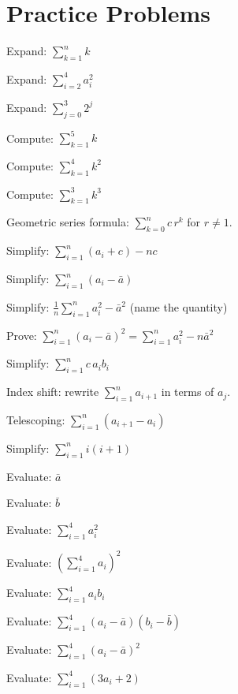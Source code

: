 \section{Practice Problems}

\begin{problems}
  \item Expand: $\displaystyle\sum_{k=1}^{n}k$
  \item Expand: $\displaystyle\sum_{i=2}^{4}a_{i}^{2}$
  \item Expand: $\displaystyle\sum_{j=0}^{3}2^{j}$
  \item Compute: $\displaystyle\sum_{k=1}^{5}k$
  \item Compute: $\displaystyle\sum_{k=1}^{4}k^{2}$
  \item Compute: $\displaystyle\sum_{k=1}^{3}k^{3}$
  \item Geometric series formula: $\displaystyle\sum_{k=0}^{n}c\,r^{k}$ for
        $r\neq 1$.
  \item Simplify: $\displaystyle\sum_{i=1}^{n}(a_{i}+c)-nc$
  \item Simplify: $\displaystyle\sum_{i=1}^{n}(a_{i}-\bar a)$
  \item Simplify: $\displaystyle\frac{1}{n}\sum_{i=1}^{n}a_{i}^{2}-\bar
        a^{2}$ (name the quantity)
  \item Prove: $\displaystyle\sum_{i=1}^{n}(a_{i}-\bar a)^{2}
        =\sum_{i=1}^{n}a_{i}^{2}-n\bar a^{2}$
  \item Simplify: $\displaystyle\sum_{i=1}^{n}c\,a_{i}b_{i}$
  \item Index shift: rewrite $\displaystyle\sum_{i=1}^{n}a_{i+1}$ in terms
        of $a_{j}$.
  \item Telescoping: $\displaystyle\sum_{i=1}^{n}(a_{i+1}-a_{i})$
  \item Simplify: $\displaystyle\sum_{i=1}^{n}i(i+1)$
  \item Evaluate: $\bar a$
  \item Evaluate: $\bar b$
  \item Evaluate: $\displaystyle\sum_{i=1}^{4}a_{i}^{2}$
  \item Evaluate: $\displaystyle\left(\sum_{i=1}^{4}a_{i}\right)^{2}$
  \item Evaluate: $\displaystyle\sum_{i=1}^{4}a_{i}b_{i}$
  \item Evaluate: $\displaystyle\sum_{i=1}^{4}(a_{i}-\bar a)(b_{i}-\bar b)$
  \item Evaluate: $\displaystyle\sum_{i=1}^{4}(a_{i}-\bar a)^{2}$
  \item Evaluate: $\displaystyle\sum_{i=1}^{4}(3a_{i}+2)$

\end{problems}
